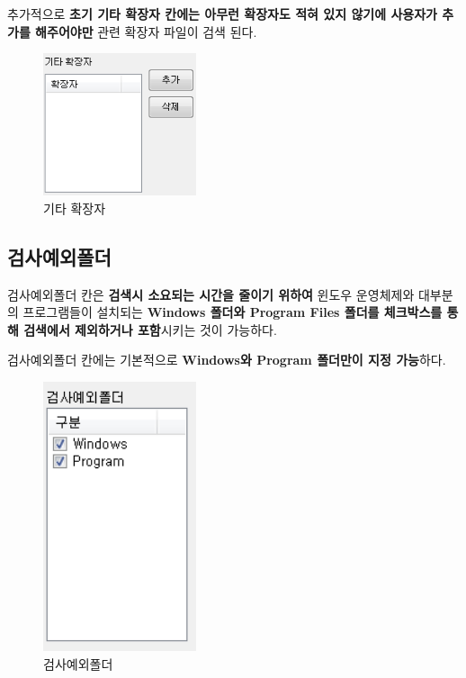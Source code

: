 \documentclass[a4paper, 13pt]{article} %
\begin{document}
		추가적으로 \textbf{초기 기타 확장자 칸에는 아무런 확장자도 적혀 있지 않기에 사용자가 추가를 해주어야만} 관련 확장자 파일이 검색 된다.
		
		\begin{figure}[h]
			\centering
			\includegraphics[width=0.4\textwidth]{Figures/etc}
			\caption{기타 확장자}
			\label{fig:etc}
		\end{figure}
	
		\newpage
	
		\subsection{검사예외폴더}	
		검사예외폴더 칸은 \textbf{검색시 소요되는 시간을 줄이기 위하여} 윈도우 운영체제와 대부분의 프로그램들이 설치되는 \textbf{ Windows 폴더와 Program Files 폴더를 체크박스를 통해 검색에서 제외하거나 포함}시키는 것이 가능하다.
		
		검사예외폴더 칸에는 기본적으로 \textbf{Windows와 Program 폴더만이 지정 가능}하다.
		
		\begin{figure}[h]
			\centering
			\includegraphics[width=0.4\textwidth]{Figures/except}
			\caption{검사예외폴더}
			\label{fig:except}
		\end{figure}
	
\end{document}
